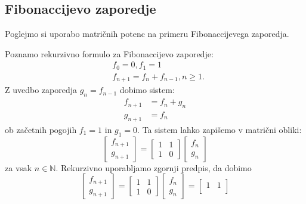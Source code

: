 \documentclass[mat1]{fmfdelo}
\newcommand{\N}{\mathbb N}
\begin{document}
\subsection{Fibonaccijevo zaporedje}
Poglejmo si uporabo matričnih potenc na primeru Fibonaccijevega zaporedja.
\begin{zgled} 
    Poznamo rekurzivno formulo za Fibonaccijevo zaporedje:
    \begin{align*}
        &f_0 = 0, f_1 = 1 \\
        &f_{n+1} = f_n + f_{n-1}, n \geq 1.
    \end{align*}
    Z uvedbo zaporedja $g_n = f_{n-1}$ dobimo sistem:
    \begin{align*}
        f_{n+1} &= f_n + g_n \\
        g_{n+1} &= f_n
    \end{align*}
    ob začetnih pogojih $f_1 = 1$ in $g_1 = 0$. Ta sistem lahko zapišemo v matrični obliki:
    \begin{equation*}
        \begin{bmatrix}
            f_{n+1} \\
            g_{n+1}
        \end{bmatrix}
        =
        \begin{bmatrix}
            1 & 1 \\
            1 & 0
        \end{bmatrix}
        \begin{bmatrix}
            f_n \\
            g_n
        \end{bmatrix}
    \end{equation*}
    za vsak $n \in \N$. Rekurzivno uporabljamo zgornji predpis, da dobimo
    \begin{equation*}
        \begin{bmatrix}
            f_{n+1} \\
            g_{n+1}
        \end{bmatrix}
        =
        \begin{bmatrix}
            1 & 1 \\
            1 & 0
        \end{bmatrix}
        \begin{bmatrix}
            f_n \\
            g_n
        \end{bmatrix}
        =
        \begin{bmatrix}
            1 & 1 \\

\end{bmatrix}
\end{equation*}
\end{zgled}
\end{document}
